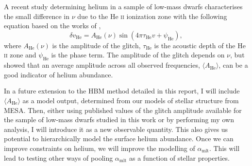 A recent study determining helium in a sample of low-mass dwarfs \citep{Verma.Raodeo.ea2019} characterises the small difference in $\nu$ due to the He \textsc{ii} ionization zone with the following equation based on the works of \citep{Houdek.Gough2007},
\begin{equation}
    \delta v_{\mathrm{He}}=A_{\mathrm{He}}(\nu) \sin \left(4 \pi \tau_{\mathrm{He}} v+\psi_{\mathrm{He}}\right),
\end{equation}
where $A_{\mathrm{He}}(\nu)$ is the amplitude of the glitch, $\tau_{\mathrm{He}}$ is the acoustic depth of the He \textsc{ii} zone and $\psi_{\mathrm{He}}$ is the phase term. The amplitude of the glitch depends on $\nu$, but \citet{Verma.Raodeo.ea2019} showed that an average amplitude across all observed frequencies, $\langle A_{\mathrm{He}} \rangle$, can be a good indicator of helium abundance.

In a future extension to the HBM method detailed in this report, I will include $\langle A_{\mathrm{He}} \rangle$ as a model output, determined from our models of stellar structure from MESA. Then, either using published values of the glitch amplitude available for the sample of low-mass dwarfs studied in this work \citep[e.g.][]{Verma.Raodeo.ea2017} or by performing my own analysis, I will introduce it as a new observable quantity. This also gives us potential to hierarchically model the surface helium abundance. Once we can improve constraints on helium, we will improve the modelling of $\alpha_\mathrm{mlt}$. This will lead to testing other ways of pooling $\alpha_\mathrm{mlt}$ as a function of stellar properties.



